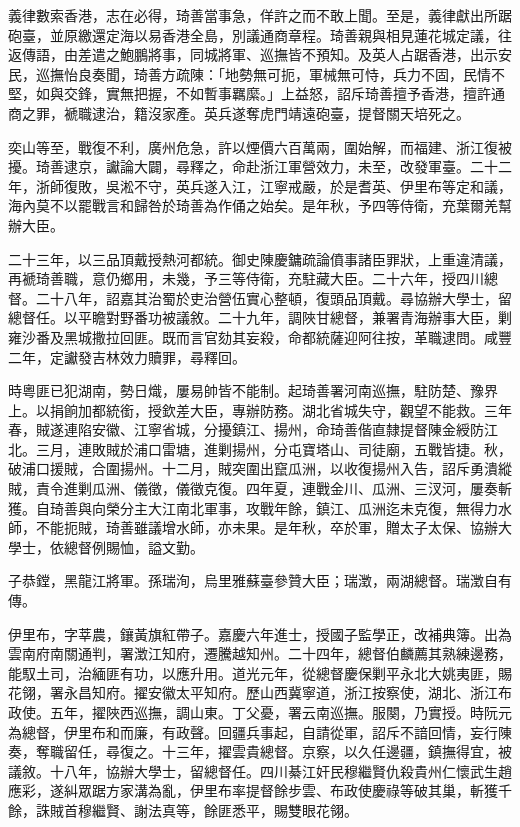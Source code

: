 \begin{pinyinscope}
義律數索香港，志在必得，琦善當事急，佯許之而不敢上聞。至是，義律獻出所踞砲臺，並原繳還定海以易香港全島，別議通商章程。琦善親與相見蓮花城定議，往返傳語，由差遣之鮑鵬將事，同城將軍、巡撫皆不預知。及英人占踞香港，出示安民，巡撫怡良奏聞，琦善方疏陳：「地勢無可扼，軍械無可恃，兵力不固，民情不堅，如與交鋒，實無把握，不如暫事羈縻。」上益怒，詔斥琦善擅予香港，擅許通商之罪，褫職逮治，籍沒家產。英兵遂奪虎門靖遠砲臺，提督關天培死之。

奕山等至，戰復不利，廣州危急，許以煙價六百萬兩，圍始解，而福建、浙江復被擾。琦善逮京，讞論大闢，尋釋之，命赴浙江軍營效力，未至，改發軍臺。二十二年，浙師復敗，吳淞不守，英兵遂入江，江寧戒嚴，於是耆英、伊里布等定和議，海內莫不以罷戰言和歸咎於琦善為作俑之始矣。是年秋，予四等侍衛，充葉爾羌幫辦大臣。

二十三年，以三品頂戴授熱河都統。御史陳慶鏞疏論僨事諸臣罪狀，上重違清議，再褫琦善職，意仍鄉用，未幾，予三等侍衛，充駐藏大臣。二十六年，授四川總督。二十八年，詔嘉其治蜀於吏治營伍實心整頓，復頭品頂戴。尋協辦大學士，留總督任。以平瞻對野番功被議敘。二十九年，調陜甘總督，兼署青海辦事大臣，剿雍沙番及黑城撒拉回匪。既而言官劾其妄殺，命都統薩迎阿往按，革職逮問。咸豐二年，定讞發吉林效力贖罪，尋釋回。

時粵匪已犯湖南，勢日熾，屢易帥皆不能制。起琦善署河南巡撫，駐防楚、豫界上。以捐餉加都統銜，授欽差大臣，專辦防務。湖北省城失守，觀望不能救。三年春，賊遂連陷安徽、江寧省城，分擾鎮江、揚州，命琦善偕直隸提督陳金綬防江北。三月，連敗賊於浦口雷塘，進剿揚州，分屯寶塔山、司徒廟，五戰皆捷。秋，破浦口援賊，合圍揚州。十二月，賊突圍出竄瓜洲，以收復揚州入告，詔斥勇潰縱賊，責令進剿瓜洲、儀徵，儀徵克復。四年夏，連戰金川、瓜洲、三汊河，屢奏斬獲。自琦善與向榮分主大江南北軍事，攻戰年餘，鎮江、瓜洲迄未克復，無得力水師，不能扼賊，琦善雖議增水師，亦未果。是年秋，卒於軍，贈太子太保、協辦大學士，依總督例賜恤，謚文勤。

子恭鏜，黑龍江將軍。孫瑞洵，烏里雅蘇臺參贊大臣；瑞澂，兩湖總督。瑞澂自有傳。

伊里布，字莘農，鑲黃旗紅帶子。嘉慶六年進士，授國子監學正，改補典簿。出為雲南府南關通判，署澂江知府，遷騰越知州。二十四年，總督伯麟薦其熟練邊務，能馭土司，治緬匪有功，以應升用。道光元年，從總督慶保剿平永北大姚夷匪，賜花翎，署永昌知府。擢安徽太平知府。歷山西冀寧道，浙江按察使，湖北、浙江布政使。五年，擢陜西巡撫，調山東。丁父憂，署云南巡撫。服闋，乃實授。時阮元為總督，伊里布和而廉，有政聲。回疆兵事起，自請從軍，詔斥不諳回情，妄行陳奏，奪職留任，尋復之。十三年，擢雲貴總督。京察，以久任邊疆，鎮撫得宜，被議敘。十八年，協辦大學士，留總督任。四川綦江奸民穆繼賢仇殺貴州仁懷武生趙應彩，遂糾眾踞方家溝為亂，伊里布率提督餘步雲、布政使慶祿等破其巢，斬獲千餘，誅賊首穆繼賢、謝法真等，餘匪悉平，賜雙眼花翎。


\end{pinyinscope}
